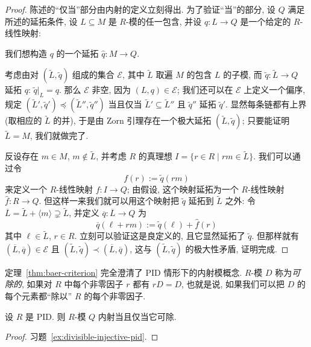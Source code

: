 \begin{proof}
陈述的``仅当''部分由内射的定义立刻得出. 为了验证``当''的部分, 设 $Q$ 满足所述的延拓条件, 设 $L\subseteq M$ 是 $R$-模的任一包含, 并设 $q:L\to Q$ 是一个给定的 $R$-线性映射:
\begin{center}
\end{center}
我们想构造 $q$ 的一个延拓 $\hat{q}:M\to Q$.

考虑由对 $(\tilde{L},\tilde{q})$ 组成的集合 $\mathcal{E}$, 其中 $\tilde{L}$ 取遍 $M$ 的包含 $L$ 的子模, 而 $\tilde{q}:\tilde{L}\to Q$ 延拓 $q$: $\tilde{q}|_L=q$. 那么 $\mathcal{E}$ 非空, 因为 $(L,q)\in\mathcal{E}$; 我们还可以在 $\mathcal{E}$ 上定义一个偏序, 规定 $(\tilde{L}',\tilde{q}')\preceq(\tilde{L}'',\tilde{q}'')$ 当且仅当 $\tilde{L}'\subseteq\tilde{L}''$ 且 $\tilde{q}''$ 延拓 $\tilde{q}'$. 显然每条链都有上界 (取相应的 $\tilde{L}$ 的并), 于是由 Zorn 引理存在一个极大延拓 $(\tilde{L},\tilde{q})$; 只要能证明 $\tilde{L}=M$, 我们就做完了.

反设存在 $m\in M$, $m\not\in\tilde{L}$, 并考虑 $R$ 的真理想 $I=\{r\in R\mid rm\in\tilde{L}\}$. 我们可以通过令
\[
f(r):=\tilde{q}(rm)
\]
来定义一个 $R$-线性映射 $f:I\to Q$; 由假设, 这个映射延拓为一个 $R$-线性映射 $\hat{f}:R\to Q$. 但这样一来我们就可以用这个映射把 $\tilde{q}$ 延拓到 $\tilde{L}$ 之外: 令 $\overline{L}=\tilde{L}+\langle m\rangle\supsetneq\tilde{L}$, 并定义 $\overline{q}:\overline{L}\to Q$ 为
\[
\overline{q}(\ell+rm):=\tilde{q}(\ell)+\hat{f}(r)
\]
其中 $\ell\in\tilde{L}$, $r\in R$. 立刻可以验证这是良定义的, 且它显然延拓了 $\tilde{q}$. 但那样就有 $(\overline{L},\overline{q})\in\mathcal{E}$ 且 $(\tilde{L},\tilde{q})\prec(\overline{L},\overline{q})$, 这与 $(\tilde{L},\tilde{q})$ 的极大性矛盾, 证明完成.
\end{proof}

定理~\ref{thm:baer-criterion} 完全澄清了 PID 情形下的内射模概念. $R$-模 $D$ 称为\emph{可除的}, 如果对 $R$ 中每个非零因子 $r$ 都有 $rD=D$, 也就是说, 如果我们可以把 $D$ 的每个元素都``除以'' $R$ 的每个非零因子.

\begin{corollary}\label{cor:pid-injective-divisible}
设 $R$ 是 PID. 则 $R$-模 $Q$ 内射当且仅当它可除.
\end{corollary}

\begin{proof}
习题~\ref{ex:divisible-injective-pid}.
\end{proof}

